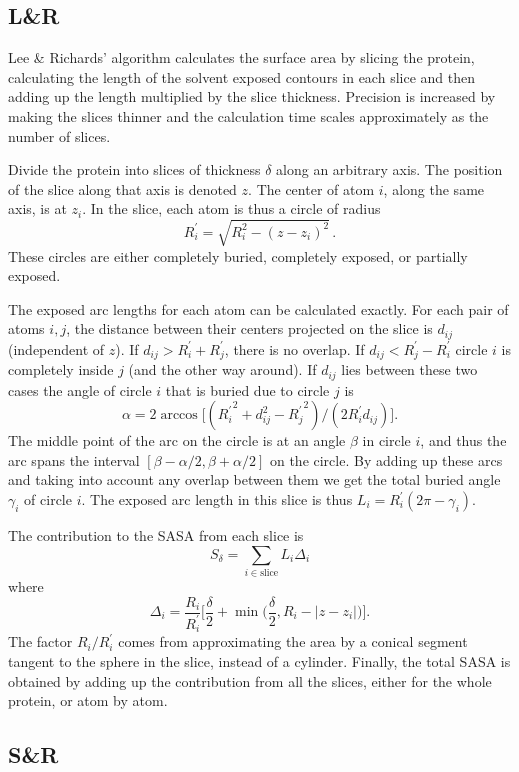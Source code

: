 \documentclass[a4paper,11pt]{article}
\begin{document}
\subsection{L\&R} \label{sec:alg_LnR}

Lee \& Richards' algorithm calculates the surface area by slicing the
protein, calculating the length of the solvent exposed contours in
each slice and then adding up the length multiplied by the slice
thickness. Precision is increased by making the slices thinner and the
calculation time scales approximately as the number of slices.

Divide the protein into slices of thickness $\delta$ along an
arbitrary axis. The position of the slice along that axis is denoted
$z$. The center of atom $i$, along the same axis, is at $z_i$. In the
slice, each atom is thus a circle of radius $$R_i^\prime =
\sqrt{R_i^2-(z-z_i)^2}\,.$$ These circles are either completely
buried, completely exposed, or partially exposed.

The exposed arc lengths for each atom can be calculated exactly. For
each pair of atoms $i,j$, the distance between their centers projected
on the slice is $d_{ij}$ (independent of $z$). If $d_{ij} > R_i^\prime
+ R_j^\prime$, there is no overlap. If $d_{ij} < R_j^\prime -
R_i^\prime$ circle $i$ is completely inside $j$ (and the other way
around). If $d_{ij}$ lies between these two cases the angle of circle
$i$ that is buried due to circle $j$ is $$\alpha = 2\arccos
\bigl[({R_i^\prime}^2 + d_{ij}^2 - {R_{j}^\prime}^2)/(2R_i^\prime
  d_{ij})\bigr].$$ The middle point of the arc on the circle is at an
angle $\beta$ in circle $i$, and thus the arc spans the interval
$[\beta-\alpha/2,\beta+\alpha/2]$ on the circle. By adding up these
arcs and taking into account any overlap between them we get the total
buried angle $\gamma_i$ of circle $i$. The exposed arc length in this
slice is thus $L_i = R_i^\prime(2\pi-\gamma_i)$.

The contribution to the SASA from each slice is $$ S_\delta =
\sum_{i \in \text{slice}}L_i\Delta_i $$ where
$$
  \Delta_i = \frac{R_i}{R_i^\prime} \biggl[\frac{\delta}{2} 
    + \min\biggl(\frac{\delta}{2},R_i -
    \lvert z - z_i \rvert\biggr)\biggr]. 
$$ 
The factor $R_i/R_i^\prime$ comes from approximating the area by a
conical segment tangent to the sphere in the slice, instead of a
cylinder.  Finally, the total SASA is obtained by adding up the
contribution from all the slices, either for the whole protein, or
atom by atom.


\subsection{S\&R}
\end{document}
